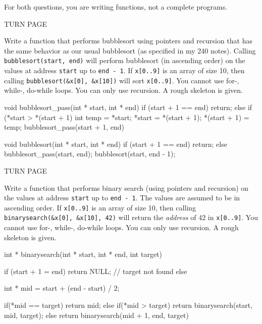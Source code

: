 

For both questions, you are writing functions, not a complete programs.

TURN PAGE

\newpage
\nextq
Write a function that performs bubblesort using pointers and recursion
that has the same behavior as our usual bubblesort
(as specified in my 240 notes).
Calling \verb!bubblesort(start, end)! will perform bubblesort (in ascending
order) on the values at address \verb!start! up to \verb!end - 1!.
If \verb!x[0..9]! is an array of size 10, then calling
\verb!bubblesort(&x[0], &x[10])! will sort \verb!x[0..9]!.
You cannot use for-, while-, do-while loops.
You can only use recursion.
A rough skeleton is given.

\ANSWER
\begin{answercode}
void bubblesort_pass(int * start, int * end)
{
    if (start + 1 == end)
    {
        return;
    }
    else
    {
        if (*start > *(start + 1)
        {
          int temp = *start;
          *start = *(start + 1);
          *(start + 1) = temp;
        }
        bubblesort_pass(start + 1, end)
    }
}

void bubblesort(int * start, int * end)
{
    if (start + 1 == end)
    {
        return;
    }
    else
    {
        bubblesort_pass(start, end);
        bubblesort(start, end - 1);
    }
}
\end{answercode}

TURN PAGE

\newpage
\nextq
Write a function that performs binary search (using pointers and recursion)
on the values at address \verb!start! up to \verb!end - 1!.
The values are assumed to be in ascending order.
If \verb!x[0..9]! is an array of size 10, then calling
\verb!binarysearch(&x[0], &x[10], 42)! will return the \textit{address} of 42
in \verb!x[0..9]!.
You cannot use for-, while-, do-while loops.
You can only use recursion.
A rough skeleton is given.

\ANSWER
\begin{answercode}
int * binarysearch(int * start, int * end, int target)
{
    if (start + 1 = end)
    {
        return NULL; // target not found
    }
    else
    {
      int * mid = start + (end - start) / 2;

      if(*mid == target)
        return mid;
      else if(*mid > target)
        return binarysearch(start, mid, target);
      else
        return binarysearch(mid + 1, end, target)
    }
}
\end{answercode}


